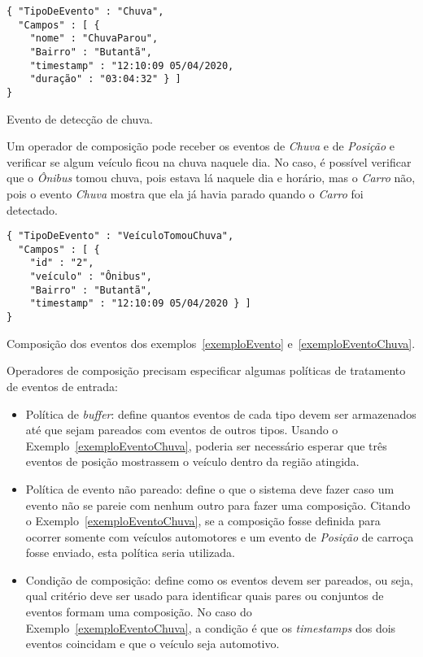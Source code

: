\begin{itemize}
\begin{evento}[t]
\begin{verbatim}
{ "TipoDeEvento" : "Chuva",
  "Campos" : [ {
    "nome" : "ChuvaParou",
    "Bairro" : "Butantã",
    "timestamp" : "12:10:09 05/04/2020,
    "duração" : "03:04:32" } ]
}
\end{verbatim}
\caption{Evento de detecção de chuva. \label{exemploEventoChuva}}
\end{evento}
Um operador de composição pode receber os eventos de \emph{Chuva} e de \emph{Posição}  e verificar se algum veículo ficou na chuva naquele dia. No caso, é possível verificar que o \textit{Ônibus} tomou chuva, pois estava lá naquele dia e horário, mas o \textit{Carro} não, pois o evento \textit{Chuva} mostra que ela já havia parado quando o \textit{Carro} foi detectado. 

\begin{evento}[t]

\begin{verbatim}
{ "TipoDeEvento" : "VeículoTomouChuva",
  "Campos" : [ {
    "id" : "2",
    "veículo" : "Ônibus",
    "Bairro" : "Butantã",
    "timestamp" : "12:10:09 05/04/2020 } ]
}
\end{verbatim}
\caption{Composição dos eventos dos exemplos~\ref{exemploEvento} e~\ref{exemploEventoChuva}.}
\end{evento}

Operadores de composição precisam especificar algumas políticas de tratamento de eventos de entrada:
\begin{itemize}
\item Política de \textit{buffer}: define quantos eventos de cada tipo devem ser armazenados até que sejam pareados com eventos de outros tipos. Usando o Exemplo~\ref{exemploEventoChuva}, poderia ser necessário esperar que três eventos de posição mostrassem o veículo dentro da região atingida.
\item Política de evento não pareado: define o que o sistema deve fazer caso um evento não se pareie com nenhum outro para fazer uma composição. Citando o Exemplo~\ref{exemploEventoChuva}, se a composição fosse definida para ocorrer somente com veículos automotores e um evento de \textit{Posição} de carroça fosse enviado, esta política seria utilizada.
\item Condição de composição: define como os eventos devem ser pareados, ou seja, qual critério deve ser usado para identificar quais pares ou conjuntos de eventos formam uma composição. No caso do Exemplo~\ref{exemploEventoChuva}, a condição é que os \textit{timestamps} dos dois eventos coincidam e que o veículo seja automotivo. 
\end{itemize}



\end{itemize}
